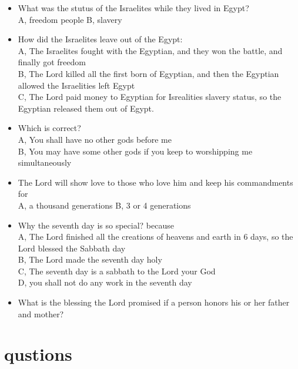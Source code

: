 \begin{itemize}
\item What was the stutus of the Israelites while they lived in Egypt?\\
A, freedom people \hspace{1cm}  B, slavery
\item How did the Israelites leave out of the Egypt: \\
A, The Israelites fought with the Egyptian, and they won the battle, and finally got freedom \\
B, The Lord killed all the first born of Egyptian, and then the Egyptian allowed the Israelities left Egypt\\
C, The Lord paid money to Egyptian for Isrealities slavery status, so the Egyptian released them out of Egypt.
\item Which is correct?\\
A, You shall have no other gods before me \\
B, You may have some other gods if you keep to worshipping me simultaneously
\item The Lord will show love to those who love him and keep his commandments for\\
A, a thousand generations  \hspace{1cm} B, 3 or 4 generations
\item Why the seventh day is so special? because\\
A, The Lord finished all the creations of heavens and earth in 6 days, so the Lord blessed the Sabbath day\\
B, The Lord made the seventh day holy\\
C, The seventh day is a sabbath to the Lord your God\\
D, you shall not do any work in the seventh day
\item What is the blessing the Lord promised if a person honors his or her father and mother?
\end{itemize}

\newpage
\section{qustions}
